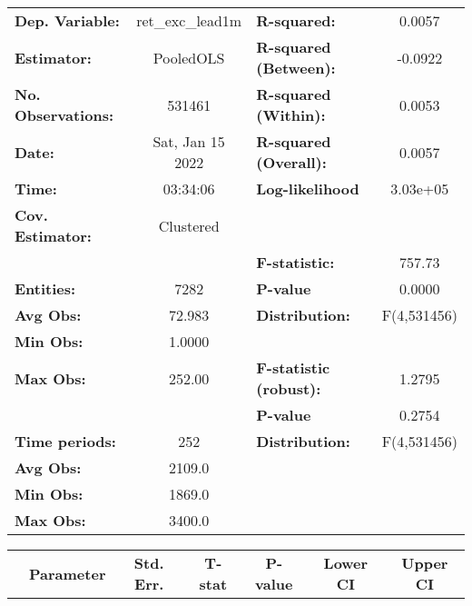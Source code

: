 \begin{center}
\begin{tabular}{lclc}
\toprule
\textbf{Dep. Variable:}    &  ret\_exc\_lead1m  & \textbf{  R-squared:         }   &      0.0057      \\
\textbf{Estimator:}        &     PooledOLS      & \textbf{  R-squared (Between):}  &     -0.0922      \\
\textbf{No. Observations:} &       531461       & \textbf{  R-squared (Within):}   &      0.0053      \\
\textbf{Date:}             &  Sat, Jan 15 2022  & \textbf{  R-squared (Overall):}  &      0.0057      \\
\textbf{Time:}             &      03:34:06      & \textbf{  Log-likelihood     }   &     3.03e+05     \\
\textbf{Cov. Estimator:}   &     Clustered      & \textbf{                     }   &                  \\
\textbf{}                  &                    & \textbf{  F-statistic:       }   &      757.73      \\
\textbf{Entities:}         &        7282        & \textbf{  P-value            }   &      0.0000      \\
\textbf{Avg Obs:}          &       72.983       & \textbf{  Distribution:      }   &   F(4,531456)    \\
\textbf{Min Obs:}          &       1.0000       & \textbf{                     }   &                  \\
\textbf{Max Obs:}          &       252.00       & \textbf{  F-statistic (robust):} &      1.2795      \\
\textbf{}                  &                    & \textbf{  P-value            }   &      0.2754      \\
\textbf{Time periods:}     &        252         & \textbf{  Distribution:      }   &   F(4,531456)    \\
\textbf{Avg Obs:}          &       2109.0       & \textbf{                     }   &                  \\
\textbf{Min Obs:}          &       1869.0       & \textbf{                     }   &                  \\
\textbf{Max Obs:}          &       3400.0       & \textbf{                     }   &                  \\
\bottomrule
\end{tabular}
\begin{tabular}{lcccccc}
                & \textbf{Parameter} & \textbf{Std. Err.} & \textbf{T-stat} & \textbf{P-value} & \textbf{Lower CI} & \textbf{Upper CI}  \\

\end{tabular}
\end{center}
